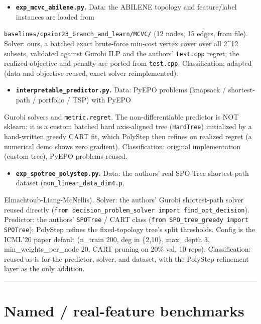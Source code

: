 \documentclass[10pt]{article}
\begin{document}
\begin{itemize}\setlength{\itemsep}{2pt}
\item \textbf{\texttt{exp\_mcvc\_abilene.py}.} Data: the ABILENE topology and feature/label instances are loaded from
\end{itemize}
  \texttt{baselines/cpaior23\_branch\_and\_learn/MCVC/} (12 nodes, 15 edges, from file). Solver: ours, a batched exact
  brute-force min-cost vertex cover over all 2\textasciicircum{}12 subsets, validated against Gurobi ILP and the authors' \texttt{test.cpp}
  regret; the realized objective and penalty are ported from \texttt{test.cpp}. Classification: adapted (data and objective
  reused, exact solver reimplemented).

\begin{itemize}\setlength{\itemsep}{2pt}
\item \textbf{\texttt{interpretable\_predictor.py}.} Data: PyEPO problems (knapsack / shortest-path / portfolio / TSP) with PyEPO
\end{itemize}
  Gurobi solvers and \texttt{metric.regret}. The non-differentiable predictor is NOT sklearn: it is a custom batched hard
  axis-aligned tree (\texttt{HardTree}) initialized by a hand-written greedy CART fit, which PolyStep then refines on realized
  regret (a numerical demo shows zero gradient). Classification: original implementation (custom tree), PyEPO problems
  reused.

\begin{itemize}\setlength{\itemsep}{2pt}
\item \textbf{\texttt{exp\_spotree\_polystep.py}.} Data: the authors' real SPO-Tree shortest-path dataset (\texttt{non\_linear\_data\_dim4.p},
\end{itemize}
  Elmachtoub-Liang-McNellis). Solver: the authors' Gurobi shortest-path solver reused directly
  (\texttt{from decision\_problem\_solver import find\_opt\_decision}). Predictor: the authors' \texttt{SPOTree} / CART class
  (\texttt{from SPO\_tree\_greedy import SPOTree}); PolyStep refines the fixed-topology tree's split thresholds. Config is the
  ICML'20 paper default (n\_train 200, deg in \{2,10\}, max\_depth 3, min\_weights\_per\_node 20, CART pruning on 20\% val, 10
  reps). Classification: reused-as-is for the predictor, solver, and dataset, with the PolyStep refinement layer as the
  only addition.

\medskip\hrule\medskip

\section*{Named / real-feature benchmarks}
\end{document}
